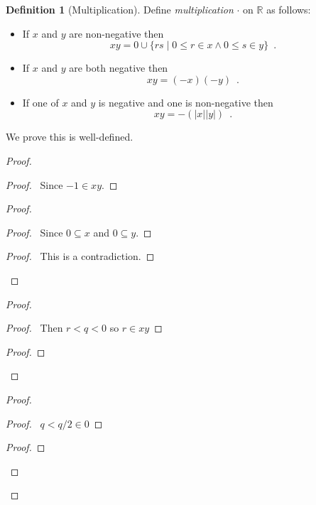\documentclass{book}
\let\qed\relax
\theoremstyle{definition}
\newtheorem{df}[ax]{Definition}
\begin{document}
\begin{df}[Multiplication]
Define \emph{multiplication} $\cdot$ on $\mathbb{R}$ as follows:
\begin{itemize}
\item If $x$ and $y$ are non-negative then
\[ xy = 0 \cup \{ rs \mid 0 \leq r \in x \wedge 0 \leq s \in y \} \enspace . \]
\item If $x$ and $y$ are both negative then
\[ xy = (-x)(-y) \enspace . \]
\item If one of $x$ and $y$ is negative and one is non-negative then
\[ xy = -(|x||y|) \enspace .\]
\end{itemize}
We prove this is well-defined.
\end{df}

\begin{proof}
\pf
{}
\begin{proof}
	\pf\ Since $-1 \in xy$.
\end{proof}
\begin{proof}
	\begin{proof}
		\pf\ Since $0 \subseteq x$ and $0 \subseteq y$.
	\end{proof}
	\qedstep
	\begin{proof}
		\pf\ This is a contradiction.
	\end{proof}
\end{proof}
\begin{proof}
	\begin{proof}
		\pf\ Then $r < q < 0$ so $r \in xy$
	\end{proof}
	\begin{proof}
	\end{proof}
\end{proof}
\begin{proof}
	\begin{proof}
		\pf\ $q < q/2 \in 0$
	\end{proof}
	\begin{proof}
	\end{proof}
\end{proof}
\qed
\end{proof}
\end{document}
